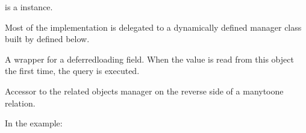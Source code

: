 \documentclass[letterpaper,10pt,english]{sphinxmanual}
\begin{document}
\begin{fulllineitems}
\begin{fulllineitems}
\sphinxAtStartPar
{} is a  instance.

\sphinxAtStartPar
Most of the implementation is delegated to a dynamically defined manager
class built by  defined below.

\end{fulllineitems}


\begin{fulllineitems}
\label{\detokenize{courses:courses.models.Lesson.objects}}
\pysigstartsignatures
\pysigline
{}
\pysigstopsignatures
\end{fulllineitems}


\begin{fulllineitems}
\label{\detokenize{courses:id9}}
\pysigstartsignatures
\pysigline
{}
\pysigstopsignatures
\sphinxAtStartPar
A wrapper for a deferred\sphinxhyphen{}loading field. When the value is read from this
object the first time, the query is executed.

\end{fulllineitems}


\begin{fulllineitems}
\label{\detokenize{courses:courses.models.Lesson.payment_set}}
\pysigstartsignatures
\pysigline
{}
\pysigstopsignatures
\sphinxAtStartPar
Accessor to the related objects manager on the reverse side of a
many\sphinxhyphen{}to\sphinxhyphen{}one relation.

\sphinxAtStartPar
In the example:

\begin{sphinxVerbatim}[commandchars=\\\{\}]
       
\end{sphinxVerbatim}


\end{fulllineitems}
\end{fulllineitems}
\end{document}

